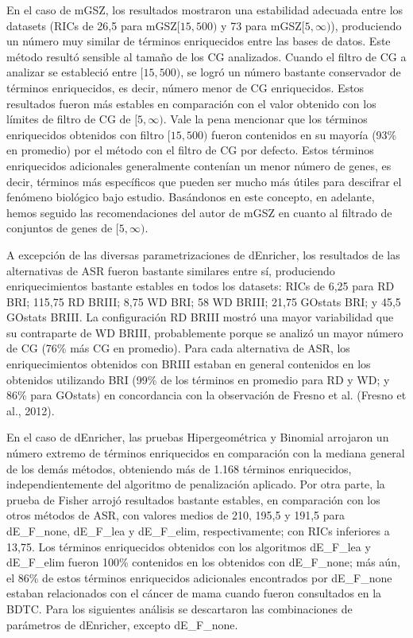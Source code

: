 \documentclass[12pt,twoside]{reedthesis}
\begin{document}
En el caso de mGSZ, los resultados mostraron una estabilidad adecuada entre los datasets (RICs de 26,5 para mGSZ\([15,500)\) y 73 para mGSZ\([5,\infty)\)), produciendo un número muy similar de términos enriquecidos entre las bases de datos. Este método resultó sensible al tamaño de los CG analizados. Cuando el filtro de CG a analizar se estableció entre \([15,500)\), se logró un número bastante conservador de términos enriquecidos, es decir, número menor de CG enriquecidos. Estos resultados fueron más estables en comparación con el valor obtenido con los límites de filtro de CG de \([5,\infty)\). Vale la pena mencionar que los términos enriquecidos obtenidos con filtro \([15,500)\) fueron contenidos en su mayoría (93\% en promedio) por el método con el filtro de CG por defecto. Estos términos enriquecidos adicionales generalmente contenían un menor número de genes, es decir, términos más específicos que pueden ser mucho más útiles para descifrar el fenómeno biológico bajo estudio. Basándonos en este concepto, en adelante, hemos seguido las recomendaciones del autor de mGSZ en cuanto al filtrado de conjuntos de genes de \([5,\infty)\).

\par

A excepción de las diversas parametrizaciones de dEnricher, los resultados de las alternativas de ASR fueron bastante similares entre sí, produciendo enriquecimientos bastante estables en todos los datasets: RICs de 6,25 para RD BRI; 115,75 RD BRIII; 8,75 WD BRI; 58 WD BRIII; 21,75 GOstats BRI; y 45,5 GOstats BRIII. La configuración RD BRIII mostró una mayor variabilidad que su contraparte de WD BRIII, probablemente porque se analizó un mayor número de CG (76\% más CG en promedio). Para cada alternativa de ASR, los enriquecimientos obtenidos con BRIII estaban en general contenidos en los obtenidos utilizando BRI (99\% de los términos en promedio para RD y WD; y 86\% para GOstats) en concordancia con la observación de Fresno et al. (Fresno et al., 2012).

\par

En el caso de dEnricher, las pruebas Hipergeométrica y Binomial arrojaron un número extremo de términos enriquecidos en comparación con la mediana general de los demás métodos, obteniendo más de 1.168 términos enriquecidos, independientemente del algoritmo de penalización aplicado. Por otra parte, la prueba de Fisher arrojó resultados bastante estables, en comparación con los otros métodos de ASR, con valores medios de 210, 195,5 y 191,5 para dE\_F\_none, dE\_F\_lea y dE\_F\_elim, respectivamente; con RICs inferiores a 13,75. Los términos enriquecidos obtenidos con los algoritmos dE\_F\_lea y dE\_F\_elim fueron 100\% contenidos en los obtenidos con dE\_F\_none; más aún, el 86\% de estos términos enriquecidos adicionales encontrados por dE\_F\_none estaban relacionados con el cáncer de mama cuando fueron consultados en la BDTC. Para los siguientes análisis se descartaron las combinaciones de parámetros de dEnricher, excepto dE\_F\_none.
\end{document}
